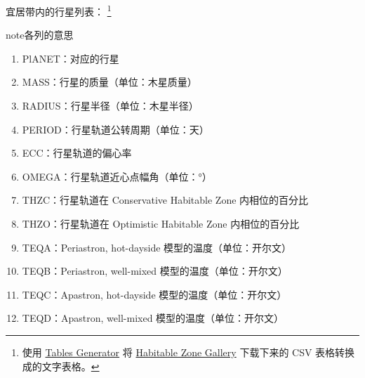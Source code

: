 \documentclass[letterpaper,10pt,english]{sphinxmanual}
\begin{document}
宜居带内的行星列表： \footnote{
使用 \href{http://www.tablesgenerator.com/text\_tables}{Tables Generator} 将 \href{http://www.hzgallery.org/}{Habitable Zone Gallery} 下载下来的 CSV 表格转换成的文字表格。
}

\begin{notice}{note}{各列的意思}
\begin{enumerate}
\item {} 
PlANET：对应的行星

\item {} 
MASS：行星的质量（单位：木星质量）

\item {} 
RADIUS：行星半径（单位：木星半径）

\item {} 
PERIOD：行星轨道公转周期（单位：天）

\item {} 
ECC：行星轨道的偏心率

\item {} 
OMEGA：行星轨道近心点幅角（单位：°）

\item {} 
THZC：行星轨道在 Conservative Habitable Zone 内相位的百分比

\item {} 
THZO：行星轨道在 Optimistic Habitable Zone 内相位的百分比

\item {} 
TEQA：Periastron, hot-dayside 模型的温度（单位：开尔文）

\item {} 
TEQB：Periastron, well-mixed 模型的温度（单位：开尔文）

\item {} 
TEQC：Apastron, hot-dayside 模型的温度（单位：开尔文）

\item {} 
TEQD：Apastron, well-mixed 模型的温度（单位：开尔文）

\end{enumerate}
\end{notice}
\end{document}
